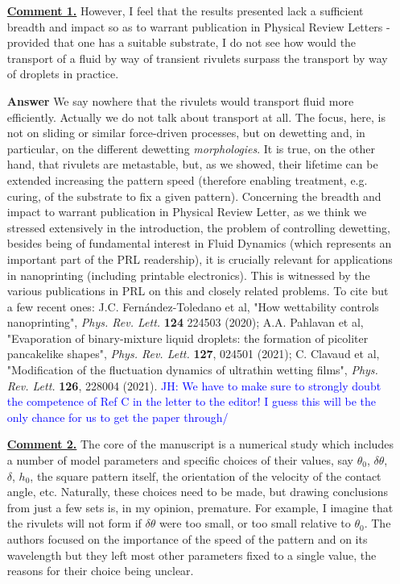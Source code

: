 \documentclass[12pt,english]{article}
\newcommand{\JH}[1]{\textcolor{blue}{JH: #1}}
\begin{document}
\begin{itemize}

\item[ \textbf{\underline{Comment 1.}}]
{ 
However, I feel that the
results presented lack a sufficient breadth and impact so as to
warrant publication in Physical Review Letters - provided that one has
a suitable substrate, I do not see how would the transport of a fluid
by way of transient rivulets surpass the transport by way of droplets
in practice.
}

\item[ \textbf{{Answer}}]
{ 
We say nowhere that the rivulets would transport fluid more efficiently. Actually 
we do not talk about transport at all. The focus, here, is not on sliding or similar force-driven processes, but 
on dewetting and, in particular, on the different dewetting {\it morphologies}. 
It is true, on the other hand, that rivulets are metastable, but, as 
we showed, their lifetime can be extended increasing the pattern speed
(therefore enabling treatment, e.g. curing, of the substrate to 
fix a given pattern).
Concerning the breadth and impact to warrant publication in Physical Review Letter, as we think we stressed extensively in the introduction,
the problem of controlling dewetting, besides being of fundamental interest in Fluid Dynamics (which represents an important part of the 
PRL readership), it is crucially relevant for applications in 
nanoprinting (including printable electronics). 
This is witnessed by the various publications in PRL on this and closely related problems. To cite but a few recent ones: J.C. Fern\'andez-Toledano et al, "How wettability controls nanoprinting",
{\it Phys. Rev. Lett.} {\bf 124} 224503 (2020); A.A. Pahlavan et al,
"Evaporation of binary-mixture liquid droplets: the formation of picoliter pancakelike shapes", {\it Phys. Rev. Lett.} {\bf 127}, 024501 (2021); C. Clavaud et al, "Modification of the fluctuation dynamics of ultrathin wetting films", {\it Phys. Rev. Lett.} {\bf 126}, 228004 (2021).
\JH{We have to make sure to strongly doubt the competence of Ref C in the letter to the editor! I guess this will be the only chance for us to get the paper through/}
}


\item[ \textbf{\underline{Comment 2.}}]
{ 
The core of the manuscript is a numerical study which includes a
number of model parameters and specific choices of their values, say
$\theta_0$, $ \delta \theta$, $\delta$, $h_0$, 
the square pattern itself, the
orientation of the velocity of the contact angle, etc. Naturally,
these choices need to be made, but drawing conclusions from just a few
sets is, in my opinion, premature.
For example, I imagine that the rivulets will not form if $\delta\theta$ were too small, or too small relative to $\theta_0$. 
The authors focused on the importance of the speed of the pattern and on its wavelength but they left most other parameters fixed to a single value, the reasons for their choice being unclear.
}


\end{itemize}
\end{document}
